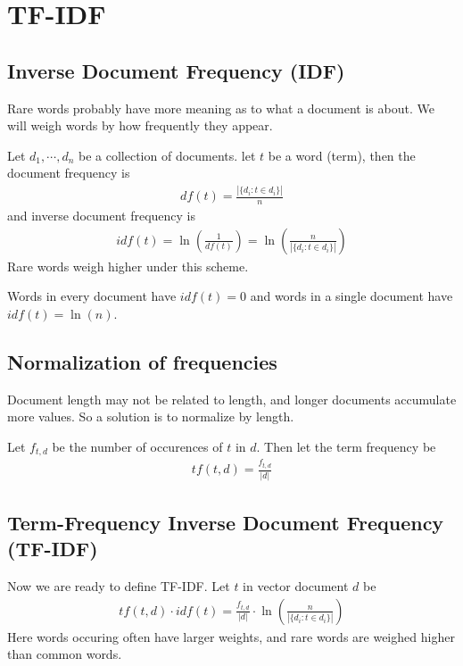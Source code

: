 \documentclass{article}
\begin{document}
  \section{TF-IDF}
      
    \subsection{Inverse Document Frequency (IDF)}
      Rare words probably have more meaning as to what a document is about. We will weigh words by how frequently they appear. 

      Let $d_1, \cdots, d_n$ be a collection of documents. let $t$ be a word (term), then the document frequency is 
      \begin{align}
        df(t) = \frac{
          |\{d_i : t \in d_i\}|
        }{n}
      \end{align}
      and inverse document frequency is 
      \begin{align}
        idf(t) = \ln(\frac{1}{df(t)}) = \ln(\frac{n}{ |\{d_i : t \in d_i\}|})
      \end{align}
      Rare words weigh higher under this scheme. 

      Words in every document have $idf(t) = 0$ and words in a single document have $idf(t) = \ln(n)$. 

      \subsection{Normalization of frequencies}
        Document length may not be related to length, and longer documents accumulate more values. So a solution is to normalize by length. 

        Let $f_{t, d}$ be the number of occurences of $t$ in $d$. Then let the term frequency be
        \begin{align}
          tf(t, d) = \frac{f_{t,d}}{|d|}
        \end{align}

      \subsection{Term-Frequency Inverse Document Frequency (TF-IDF)}
        Now we are ready to define TF-IDF. Let $t$ in vector document $d$ be
        \begin{align}
          tf(t, d) \cdot idf(t) = \frac{f_{t,d}}{|d|} \cdot \ln(\frac{n}{|\{d_i : t \in d_i\}|})
        \end{align}
        Here words occuring often have larger weights, and rare words are weighed higher than common words.
\end{document}
